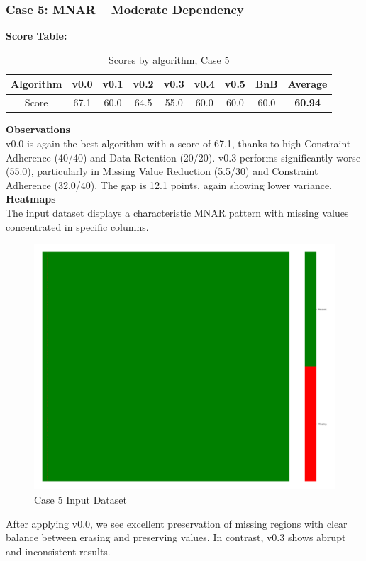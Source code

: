 \documentclass[a4paper,12pt]{article}
\begin{document}
\subsubsection{Case 5: MNAR – Moderate Dependency}

\textbf{Score Table:}

\begin{table}[H]
\centering
\caption{Scores by algorithm, Case 5}
\label{tab:score_algorithms_case5}
\begin{tabular}{|c|c|c|c|c|c|c|c|c|}
\hline
Algorithm & v0.0 & v0.1 & v0.2 & v0.3 & v0.4 & v0.5 & BnB & Average \\
\hline
Score & 67.1 & 60.0 & 64.5 & 55.0 & 60.0 & 60.0 & 60.0 & \textbf{60.94} \\
\hline
\end{tabular}
\end{table}

\textbf{Observations}\\
v0.0 is again the best algorithm with a score of 67.1, thanks to high Constraint Adherence (40/40) and Data Retention (20/20). v0.3 performs significantly worse (55.0), particularly in Missing Value Reduction (5.5/30) and Constraint Adherence (32.0/40). The gap is 12.1 points, again showing lower variance.  
\textbf{Heatmaps}\\
The input dataset displays a characteristic MNAR pattern with missing values concentrated in specific columns.

\begin{figure}[H]
    \centering
    \includegraphics[width=0.5\linewidth]{case5_heatmap_erased.png}
    \caption{Case 5 Input Dataset}
\end{figure}

After applying v0.0, we see excellent preservation of missing regions with clear balance between erasing and preserving values. In contrast, v0.3 shows abrupt and inconsistent results.
\end{document}
